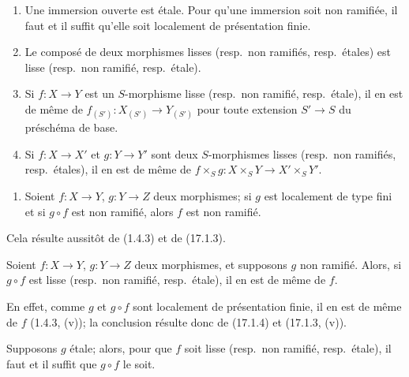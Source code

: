 \begin{proposition}[17.3.3]
\label{IV.17.3.3}
\begin{enumerate}
  \item[\textup{(i)}] Une immersion ouverte est étale. Pour qu'une immersion soit non ramifiée, il faut et il suffit qu'elle soit localement de présentation finie.
  \item[\textup{(ii)}] Le composé de deux morphismes lisses \textup{(resp.}\ non ramifiés, \textup{resp.}\ étales\textup{)} est lisse \textup{(resp.}\ non ramifié, \textup{resp.}\ étale\textup{)}.
  \item[\textup{(iii)}] Si $f:X\to Y$ est un $S$-morphisme lisse \textup{(resp.}\ non ramifié, \textup{resp.}\ étale\textup{)}, il en est de même de $f_{(S')}:X_{(S')}\to Y_{(S')}$ pour toute extension $S'\to S$ du préschéma de base.
  \item[\textup{(iv)}] Si $f:X\to X'$ et $g:Y\to Y'$ sont deux $S$-morphismes lisses \textup{(resp.}\ non ramifiés, \textup{resp.}\ étales\textup{)}, il en est de même de $f\times_S g:X\times_S Y\to X'\times_S Y'$.
\end{enumerate}


\begin{enumerate}
  \item[\textup{(v)}] Soient $f:X\to Y$, $g:Y\to Z$ deux morphismes; si $g$ est localement de type fini et si $g\circ f$ est non ramifié, alors $f$ est non ramifié.
\end{enumerate}
\end{proposition}

Cela résulte aussitôt de (1.4.3) et de (17.1.3).

\begin{proposition}[17.3.4]
\label{IV.17.3.4}
Soient $f:X\to Y$, $g:Y\to Z$ deux morphismes, et supposons $g$ non ramifié. Alors, si $g\circ f$ est lisse \textup{(resp.}\ non ramifié, \textup{resp.}\ étale\textup{)}, il en est de même de $f$.
\end{proposition}

En effet, comme $g$ et $g\circ f$ sont localement de présentation finie, il en est de même de $f$ (1.4.3, (v)); la conclusion résulte donc de (17.1.4) et (17.1.3, (v)).

\begin{corollary}[17.3.5]
\label{IV.17.3.5}
Supposons $g$ étale; alors, pour que $f$ soit lisse \textup{(resp.}\ non ramifié, \textup{resp.}\ étale\textup{)}, il faut et il suffit que $g\circ f$ le soit.
\end{corollary}

